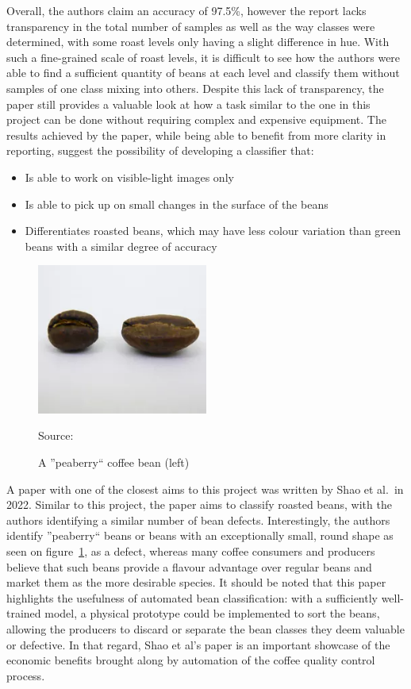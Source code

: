 Overall, the authors claim an accuracy of 97.5\%, however the report lacks
transparency in the total number of samples as well as the way classes were
determined, with some roast levels only having a slight difference in hue.
With
such a fine-grained scale of roast levels, it is difficult to see how the authors
were able to find a sufficient quantity of beans at each level and classify them
without samples of one class mixing into others.
Despite this lack of
transparency, the paper still provides a valuable look at how a task similar to the
one in this project can be done without requiring complex and expensive equipment.
The results achieved by the paper, while being able to benefit from more clarity
in reporting, suggest the possibility of developing a classifier that:
\begin{itemize}
	\item Is able to work on visible-light images only

	\item Is able to pick up on small changes in the surface of the beans

	\item Differentiates roasted beans, which may have less colour variation than
		green beans with a similar degree of accuracy
\end{itemize}

\begin{figure}
	\includegraphics[width=0.5\textwidth]{figures/litReview/peaberry-vs-normal}
	\caption*
	{Source: \cite{peaberryImg}}
	\caption{A ''peaberry`` coffee bean (left)}
	\label{fig:peaberryComparison}
\end{figure}
A paper with one of the closest aims to this project was written by Shao et al.\ in %
2022\cite{rgbDeepLearningShao}.
Similar to this project, the paper aims to
classify roasted beans, with the authors identifying a similar number of bean defects.
Interestingly, the authors identify ''peaberry`` beans or beans with an exceptionally
small, round shape as seen on figure~\ref{fig:peaberryComparison}, as a defect,
whereas many coffee consumers and producers believe that such beans provide a
flavour advantage over regular beans and market them as the more desirable
species.
It should be noted that this paper highlights the usefulness of automated
bean classification: with a sufficiently well-trained model, a physical prototype
could be implemented to sort the beans, allowing the producers to discard or
separate the bean classes they deem valuable or defective.
In that regard, Shao
et al's paper is an important showcase of the economic benefits brought along by
automation of the coffee quality control process.

